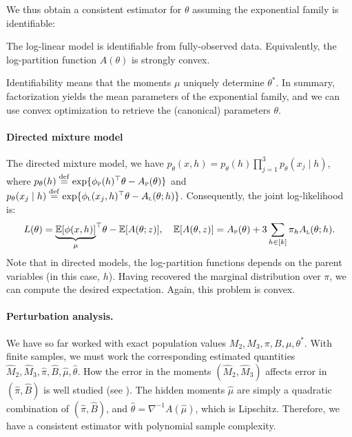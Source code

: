 We thus obtain a consistent estimator for $\theta$ assuming the exponential family is identifiable:
\begin{assumption}
The log-linear model is identifiable from fully-observed data.
Equivalently, the log-partition function $A(\theta)$ is strongly convex.
\end{assumption}
Identifiability means that the moments $\mu$ uniquely determine $\theta^*$.
In summary, factorization yields the mean parameters of the exponential family,
and we can use convex optimization to retrieve the (canonical) parameters $\theta$.

\paragraph{Directed mixture model}

The directed mixture model, we have $p_\theta(x,h) = p_\theta(h) \prod_{j=1}^3 p_\theta(x_j \mid h)$,
where
$p_\theta(h) \stackrel{\rm def}{=} \exp\{\phi_\text{\sc p}(h)^\top\theta - A_\text{\sc p}(\theta)\}$
and
$p_\theta(x_j \mid h) \stackrel{\rm def}{=} \exp\{\phi_\text{\sc l}(x_j, h)^\top\theta - A_\text{\sc l}(\theta; h)\}$.
Consequently, the joint log-likelihood is:
\begin{align}
  L(\theta) = {\underbrace{\mathbb{E}[\phi(x,h)]}_{\mu}}^\top\theta - \mathbb{E}[A(\theta; z)], \quad
  \mathbb{E}[A(\theta, z)] = A_\text{\sc p}(\theta) + 3 \sum_{h \in [k]} \pi_h A_\text{\sc l}(\theta;h).
\end{align}
Note that in directed models, the log-partition functions depends on the parent variables (in this case, $h$).
Having recovered the marginal distribution over $\pi$, we can compute the desired expectation.
Again, this problem is convex.

\paragraph{Perturbation analysis.}
We have so far worked with exact population values $M_2,M_3,\pi,B,\mu,\theta^*$.
With finite samples, we must work the corresponding estimated quantities $\hat M_2,\hat M_3,\hat\pi,\hat B,\hat\mu,\hat\theta$.
How the error in the moments $(\hat M_2,\hat M_3)$ affects error in $(\hat\pi,\hat B)$ is well studied
(see \citet{anandkumar12moments,anandkumar13tensor}).
The hidden moments $\hat\mu$ are simply a quadratic combination of $(\hat\pi,\hat B)$,
and $\hat\theta = \nabla^{-1} A(\hat\mu)$, which is Lipschitz.
Therefore, we have a consistent estimator with polynomial sample complexity.
